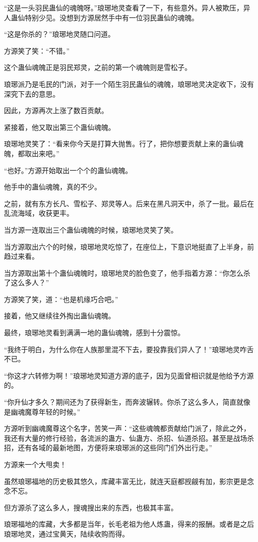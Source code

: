 \begin{this_body}
“这是一头羽民蛊仙的魂魄呀。”琅琊地灵查看了一下，有些意外。异人被欺压，异人蛊仙特别少见。没想到方源居然手中有一位羽民蛊仙的魂魄。

“这是你杀的？”琅琊地灵随口问道。

方源笑了笑：“不错。”

这个蛊仙魂魄正是羽民郑灵，之前的第一个魂魄则是雪松子。

琅琊派乃是毛民的门派，对于一个陌生羽民蛊仙的魂魄，琅琊地灵决定收下，没有深究下去的意思。

因此，方源再次上涨了数百贡献。

紧接着，他又取出第三个蛊仙魂魄。

琅琊地灵笑了：“看来你今天是打算大抛售。行了，把你想要贡献上来的蛊仙魂魄，都取出来吧。”

“也好。”方源开始取出一个个的蛊仙魂魄。

他手中的蛊仙魂魄，真的不少。

之前，就有东方长凡、雪松子、郑灵等人。后来在黑凡洞天中，杀了一批。最后在乱流海域，收获更丰。

当方源一连取出三个蛊仙魂魄的时候，琅琊地灵笑了笑。

当方源取出六个的时候，琅琊地灵吃惊了，在座位上，下意识地挺直了上半身，前趋过来看。

当方源取出第十个蛊仙魂魄时，琅琊地灵的脸色变了，他手指着方源：“你怎么杀了这么多人？”

方源笑了笑，道：“也是机缘巧合吧。”

接着，他又继续往外掏出蛊仙魂魄。

最终，琅琊地灵看到满满一地的蛊仙魂魄，感到十分震惊。

“我终于明白，为什么你在人族那里混不下去，要投靠我们异人了！”琅琊地灵咋舌不已。

“你这才六转修为啊！”琅琊地灵知道方源的底子，因为见面曾相识就是他给予方源的。

“你升仙才多久？期间还为了获得新生，而奔波辗转。你杀了这么多人，简直就像是幽魂魔尊年轻的时候。”

方源听到幽魂魔尊这个名字，苦笑一声：“这些魂魄都贡献给门派了，除此之外，我还有大量的修行经验，各流派的蛊方、仙蛊方、杀招、仙道杀招。甚至是战场杀招，还有各域的最新地图，方便将来琅琊派的这些同门们外出行走。”

方源来一个大甩卖！

虽然琅琊福地的历史极其悠久，库藏丰富无比，就连天庭都觊觎有加，影宗更是念念不忘。

但方源杀了这么多人，搜魂搜出来的东西，也极其丰富。

琅琊福地的库藏，大多都是当年，长毛老祖为他人炼蛊，得来的报酬。或者是之后琅琊地灵，通过宝黄天，陆续收购而得。


\end{this_body}
